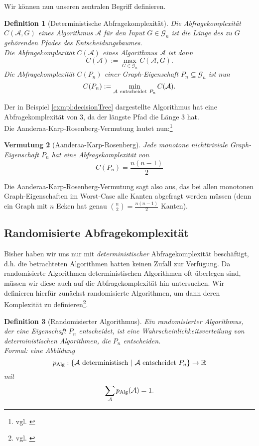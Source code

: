 \documentclass[10pt,a4paper, footheight=1mm, bibliography=totoc]{scrreprt}
\newtheorem{definition}{Definition}
\newtheorem{conjecture}[definition]{Vermutung}
\theoremstyle{definition}
\begin{document}
Wir können nun unseren zentralen Begriff definieren.

\begin{definition}[Deterministische Abfragekomplexität]
Die \emph{Abfragekomplexität} $C(\mathcal{A},G)$ eines
Algorithmus $\mathcal{A}$ für den Input $G\in \mathcal{G}_n$ ist
die Länge des zu $G$ gehörenden Pfades des
Entscheidungsbaumes. \\
Die \emph{Abfragekomplexität} $C(\mathcal{A})$ eines
Algorithmus $\mathcal{A}$ ist dann
$$ C(\mathcal{A}) := \max_{G \in \mathcal{G}_n} C(\mathcal{A},G).$$
Die \emph{Abfragekomplexität} $C(P_n)$ einer Graph-Eigenschaft
$P_n\subseteq \mathcal{G}_n$ ist nun
$$ C(P_n) := \min_{\mathcal{A} \ {\rm entscheidet}\  P_n} C(\mathcal{A}).$$
\end{definition}

Der in Beispiel \ref{exmpl:decisionTree} dargestellte
Algorithmus hat eine Abfragekomplexität von $3$, da
der längste Pfad die Länge $3$ hat. \\
Die Aanderaa-Karp-Rosenberg-Vermutung lautet nun:\footnote{vgl. \cite[S.9]{Lovasz}}
\begin{conjecture}[Aanderaa-Karp-Rosenberg]
Jede monotone nichttriviale Graph-Eigenschaft $P_n$
hat eine Abfragekomplexität von
$$C(P_n) = \frac{n(n-1)}{2}$$
\end{conjecture}
Die Aanderaa-Karp-Rosenberg-Vermutung sagt also aus,
das bei allen monotonen Graph-Eigenschaften im Worst-Case
alle Kanten abgefragt werden müssen (denn ein Graph mit
$n$ Ecken hat genau ${\binom{n}{2}=\frac{n(n-1)}{2}}$ Kanten).

\subsection{Randomisierte Abfragekomplexität}

Bisher haben wir uns nur mit \emph{deterministischer}
Abfragekomplexität beschäftigt, d.h. die betrachteten
Algorithmen hatten keinen Zufall zur Verfügung.
Da randomisierte Algorithmen deterministischen Algorithmen
oft überlegen sind, müssen wir diese auch auf
die Abfragekomplexität hin untersuchen.
Wir definieren hierfür zunächst randomisierte Algorithmen,
um dann deren Komplexität zu definieren\footnote{vgl.
\cite[S.120]{Groeger}}.
\begin{definition}[Randomisierter Algorithmus]
Ein \emph{randomisierter Algorithmus}, der eine
Eigenschaft $P_n$ entscheidet, ist eine
Wahrscheinlichkeitsverteilung von deterministischen
Algorithmen, die $P_n$ entscheiden. \\
Formal: eine Abbildung
$$ p_\textup{Alg}: \{ \mathcal{A} \ \textup {deterministisch} \ | \
         \mathcal{A} \ {\rm entscheidet} \ P_n \} \to \mathbb{R} $$
mit 
$$\sum_\mathcal{A} p_\textup{Alg}(\mathcal{A}) = 1.$$
\end{definition}
\end{document}
